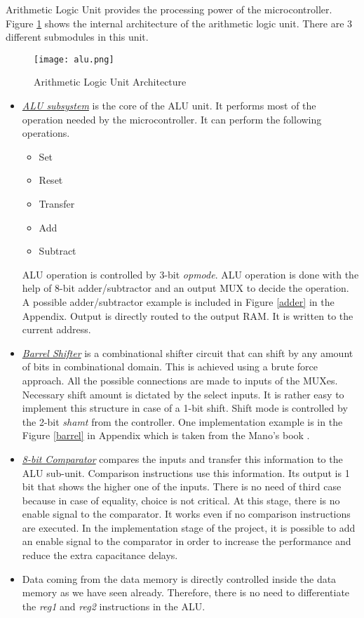 \documentclass[12pt]{article}
\begin{document}
Arithmetic Logic Unit provides the processing power of the microcontroller. Figure \ref{alu} shows the internal architecture of the arithmetic logic unit. There are 3 different submodules in this unit. 

\begin{figure}[H]
\centering
\texttt{[image: alu.png]}
\caption{Arithmetic Logic Unit Architecture}
\label{alu}
\end{figure}

\begin{itemize} 
\item \underline{\textsl{ALU subsystem}} is the core of the ALU unit. It performs most of the operation needed by the microcontroller. It can perform the following operations.
\begin{itemize}
\item Set
\item Reset 
\item Transfer
\item Add 
\item Subtract 
\end{itemize} 
ALU operation is controlled by 3-bit \textsl{opmode}. ALU operation is done with the help of 8-bit adder/subtractor and an output MUX to decide the operation. A possible adder/subtractor example is included in Figure \ref{adder} in the Appendix. Output is directly routed to the output RAM. It is written to the current address.

\item \underline{\textsl{Barrel Shifter}} is a combinational shifter circuit that can shift by any amount of bits in combinational domain. This is achieved using a brute force approach. All the possible connections are made to inputs of the MUXes. Necessary shift amount is dictated by the select inputs. It is rather easy to implement this structure in case of a 1-bit shift. Shift mode is controlled by the 2-bit \textsl{shamt} from the controller. One implementation example is in the Figure \ref{barrel} in Appendix which is taken from the Mano's book \cite{b1}. 

\item \underline{\textsl{8-bit Comparator}} compares the inputs and transfer this information to the ALU sub-unit. Comparison instructions use this information. Its output is 1 bit that shows the higher one of the inputs. There is no need of third case because in case of equality, choice is not critical. At this stage, there is no enable signal to the comparator. It works even if no comparison instructions are executed. In the implementation stage of the project, it is possible to add an enable signal to the comparator in order to increase the performance and reduce the extra capacitance delays. 

\item Data coming from the data memory is directly controlled inside the data memory as we have seen already. Therefore, there is no need to differentiate the \textsl{reg1} and \textsl{reg2} instructions in the ALU.
\end{itemize}
\end{document}
